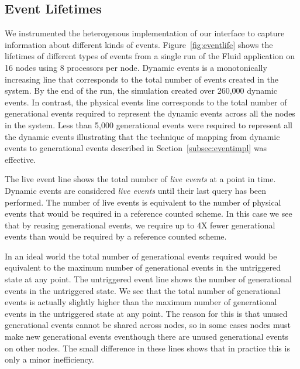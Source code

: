 \subsection{Event Lifetimes}
\label{subsec:eventlife}
We instrumented the heterogenous implementation of our interface to 
capture information about different kinds of events.  Figure~\ref{fig:eventlife} shows
the lifetimes of different types of events from a single run of the Fluid
application on 16 nodes using 8 processors per node.  Dynamic events 
is a monotonically increasing line that
corresponds to the total number of events created in the system.  By
the end of the run, the simulation created over 260,000 dynamic
events.  In contrast, the physical events line corresponds to the total number
of generational events required to represent the dynamic events 
across all the nodes in the system.  Less than 5,000
generational events were required to represent all the dynamic events
illustrating that the technique of mapping from dynamic events to generational 
events described in Section~\ref{subsec:eventimpl} was effective.

The live event line shows the total number of {\em live events} at a point in time.  Dynamic events
are considered {\em live events} until their last query has been performed.  The number of live
events is equivalent to the number of physical events that would be required
in a reference counted scheme.  In this case we see that by reusing
generational events, we require up to 4X fewer generational events than would be
required by a reference counted scheme.

In an ideal world the total number of generational events required would be
equivalent to the maximum number of generational events in the untriggered
state at any point.  The untriggered event line shows the number of generational
events in the untriggered state.  We see that the total number of generational
events is actually slightly higher than the maximum number of generational
events in the untriggered state at any point.  The reason for this is that unused
generational events cannot be shared across nodes, so in some cases nodes must
make new generational events eventhough there are unused generational events
on other nodes.  The small difference in these lines shows that in practice
this is only a minor inefficiency.

